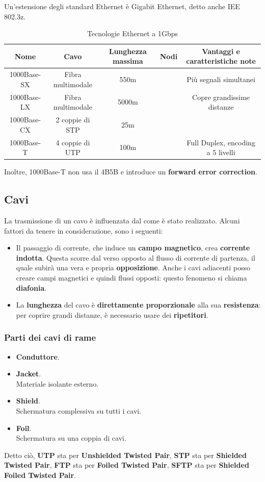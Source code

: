 Un'estensione degli standard Ethernet è Gigabit Ethernet, detto anche IEE 802.3z.
\begin{table}[htp]
	\centering
	\begin{tabular}{|c|c|c|c|c|}
		\hline
		Nome & Cavo & Lunghezza massima & Nodi & Vantaggi e caratteristiche note\\
		\hline
		1000Base-SX & Fibra multimodale & 550m &  & Più segnali simultanei\\
		\hline
		1000Base-LX & Fibra multimodale & 5000m &  &  Copre grandissime distanze\\
		\hline
		1000Base-CX & 2 coppie di STP & 25m &  & \\
		\hline
		1000Base-T & 4 coppie di UTP  & 100m &  & Full Duplex, encoding a 5 livelli\\
		\hline
	\end{tabular}
	\caption{Tecnologie Ethernet a 1Gbps}
\end{table}

Inoltre, 1000Base-T non usa il 4B5B e introduce un \textbf{forward error correction}.
\newpage

\subsection{Cavi}
La trasmissione di un cavo è influenzata dal come è stato realizzato. Alcuni fattori da tenere in considerazione, sono i seguenti:

\begin{itemize}
	\item Il passaggio di corrente, che induce un \textbf{campo magnetico}, crea \textbf{corrente indotta}. Questa scorre dal verso opposto al flusso di corrente di partenza, il quale subirà una vera e propria \textbf{opposizione}. Anche i cavi adiacenti posso creare campi magnetici e quindi flussi opposti: questo fenomeno si chiama \textbf{diafonia}.
	
	\item La \textbf{lunghezza} del cavo è \textbf{direttamente proporzionale} alla sua \textbf{resistenza}: per coprire grandi distanze, è necessario usare dei \textbf{ripetitori}.
\end{itemize}

\subsubsection{Parti dei cavi di rame}
\begin{itemize}
	\item \textbf{Conduttore}.
	\item \textbf{Jacket}.\\
	Materiale isolante esterno.
	\item \textbf{Shield}.\\
	Schermatura complessiva su tutti i cavi.
	\item \textbf{Foil}.\\
	Schermatura su una coppia di cavi.
\end{itemize}
Detto ciò, \textbf{UTP} sta per \textbf{Unshielded Twisted Pair}, \textbf{STP} sta per \textbf{Shielded Twisted Pair}, \textbf{FTP} sta per \textbf{Foiled Twisted Pair}, \textbf{SFTP} sta per \textbf{Shielded Foiled Twisted Pair}.

